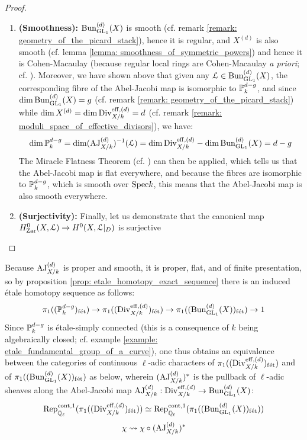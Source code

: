 \begin{proof}
\begin{enumerate}
                            \item \textbf{(Smoothness):} $\Bun_{\GL_1}^{(d)}(X)$ is smooth (cf. remark \ref{remark: geometry_of_the_picard_stack}), hence it is regular, and $X^{(d)}$ is also smooth (cf. lemma \ref{lemma: smoothness_of_symmetric_powers}) and hence it is Cohen-Macaulay (because regular local rings are Cohen-Macaulay \textit{a priori}; cf. \cite[\href{https://stacks.math.columbia.edu/tag/00NQ}{Tag 00NQ}]{stacks}). Moreover, we have shown above that given any $\calL \in \Bun_{\GL_1}^{(d)}(X)$, the corresponding fibre of the Abel-Jacobi map is isomorphic to $\P^{d - g}_k$, and since $\dim \Bun_{\GL_1}^{(d)}(X) = g$ (cf. remark \ref{remark: geometry_of_the_picard_stack}) while $\dim X^{(d)} = \dim \Div_{X/k}^{\eff, (d)} = d$ (cf. remark \ref{remark: moduli_space_of_effective_divisors}), we have:
                                $$\dim \P^{d - g}_k = \dim (\AJ_{X/k}^{(d)})^{-1}(\calL) = \dim \Div_{X/k}^{\eff, (d)} - \dim \Bun_{\GL_1}^{(d)}(X) = d - g$$
                            The Miracle Flatness Theorem (cf. \cite[\href{https://stacks.math.columbia.edu/tag/00R4}{Tag 00R4}]{stacks}) can then be applied, which tells us that the Abel-Jacobi map is flat everywhere, and because the fibres are isomorphic to $\P^{d - g}_k$, which is smooth over $\Spec k$, this means that the Abel-Jacobi map is also smooth everywhere.
                            \item \textbf{(Surjectivity):} Finally, let us demonstrate that the canonical map $H^0_{\Zar}(X, \calL) \to H^0(X, \calL|_D)$ is surjective
                        \end{enumerate}
                \end{proof}
            \begin{corollary} \label{coro: unramified_galois_representations_induced_by_the_abel_jacobi_map}
                Because $\AJ_{X/k}^{(d)}$ is proper and smooth, it is proper, flat, and of finite presentation, so by proposition \ref{prop: etale_homotopy_exact_sequence} there is an induced \'etale homotopy sequence as follows:
                    $$\pi_1((\P^{d - g}_k)_{\fet}) \to \pi_1((\Div_{X/k}^{\eff, (d)})_{\fet}) \to \pi_1((\Bun_{\GL_1}^{(d)}(X))_{\fet}) \to 1$$
                Since $\P^{d - g}_k$ is \'etale-simply connected (this is a consequence of $k$ being algebraically closed; cf. example \ref{example: etale_fundamental_group_of_a_curve}), one thus obtains an equivalence between the categories of continuous $\ell$-adic characters of $\pi_1((\Div_{X/k}^{\eff, (d)})_{\fet})$ and of $\pi_1((\Bun_{\GL_1}^{(d)}(X))_{\fet})$ as below, wherein $(\AJ_{X/k}^{(d)})^*$ is the pullback of $\ell$-adic sheaves along the Abel-Jacobi map $\AJ_{X/k}^{(d)}: \Div_{X/k}^{\eff, (d)} \to \Bun_{\GL_1}^{(d)}(X)$:
                    $$\Rep^{\cont, 1}_{\bar{\Q}_{\ell}}(\pi_1((\Div_{X/k}^{\eff, (d)})_{\fet})) \cong \Rep^{\cont, 1}_{\bar{\Q}_{\ell}}(\pi_1((\Bun_{\GL_1}^{(d)}(X))_{\fet}))$$
                    $$\chi \mapsto \chi \circ (\AJ_{X/k}^{(d)})^*$$
            \end{corollary}
    
